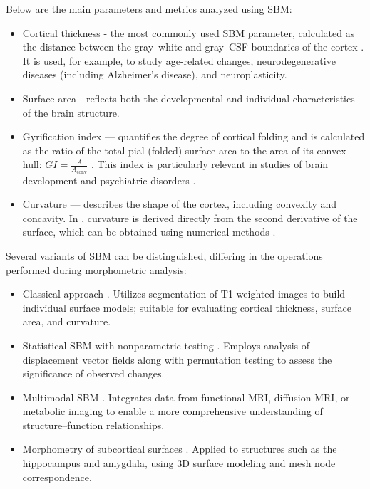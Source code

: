 \documentclass[default]{subfiles}
\begin{document}
Below are the main parameters and metrics analyzed using SBM:\newline

\begin{itemize}
    \item Cortical thickness - the most commonly used SBM parameter, calculated as the distance between the gray–white
    and gray–CSF boundaries of the cortex \cite{evans_2015}. It is used, for example, to study age-related changes,
    neurodegenerative diseases (including Alzheimer’s disease), and neuroplasticity.
    
    \item Surface area - reflects both the developmental and individual characteristics of the brain structure.
    
    \item Gyrification index — quantifies the degree of cortical folding and is calculated as the ratio of the total
    pial (folded) surface area to the area of its convex hull: $GI = \frac{A}{A_{\text{conv}}}$ \cite{zilles_1988}.
    This index is particularly relevant in studies of brain development and psychiatric disorders \cite{goto_2022}.
    
    \item Curvature — describes the shape of the cortex, including convexity and concavity. In \cite{fischl_2000},
    curvature is derived directly from the second derivative of the surface, which can be obtained using numerical
    methods \cite{meyer_2003}.\newline
\end{itemize}

Several variants of SBM can be distinguished, differing in the operations performed during morphometric
analysis:\newline
\begin{itemize}
    \item Classical approach \cite{fischl_2012}. Utilizes segmentation of T1-weighted images to build individual
    surface models; suitable for evaluating cortical thickness, surface area, and curvature.

    \item Statistical SBM with nonparametric testing \cite{pantazis_2004}. Employs analysis of displacement vector
    fields along with permutation testing to assess the significance of observed changes.

    \item Multimodal SBM \cite{goto_2022}. Integrates data from functional MRI, diffusion MRI, or metabolic imaging to
    enable a more comprehensive understanding of structure–function relationships.

    \item Morphometry of subcortical surfaces \cite{devanand_2012}. Applied to structures such as the hippocampus and
    amygdala, using 3D surface modeling and mesh node correspondence.\newline
\end{itemize}
\end{document}
